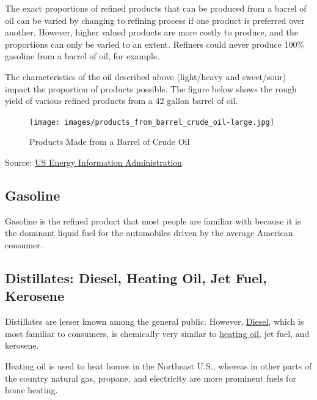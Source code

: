 \documentclass[
  letterpaper,
  DIV=11,
  numbers=noendperiod]{scrreprt}
\begin{document}
The exact proportions of refined products that can be produced from a
barrel of oil can be varied by changing to refining process if one
product is preferred over another. However, higher valued products are
more costly to produce, and the proportions can only be varied to an
extent. Refiners could never produce 100\% gasoline from a barrel of
oil, for example.

The characteristics of the oil described above (light/heavy and
sweet/sour) impact the proportion of products possible. The figure below
shows the rough yield of various refined products from a 42 gallon
barrel of oil.

\begin{figure}[H]

{\centering \texttt{[image: images/products\_from\_barrel\_crude\_oil-large.jpg]}

}

\caption{Products Made from a Barrel of Crude Oil}

\end{figure}%

Source:
\href{http://www.eia.gov/Energyexplained/index.cfm?page=oil_home}{US
Energy Information Administration}

\subsection{Gasoline}\label{gasoline}

Gasoline is the refined product that most people are familiar with
because it is the dominant liquid fuel for the automobiles driven by the
average American consumer.

\subsection{Distillates: Diesel, Heating Oil, Jet Fuel,
Kerosene}\label{distillates-diesel-heating-oil-jet-fuel-kerosene}

Distillates are lesser known among the general public. However,
\href{http://www.eia.gov/Energyexplained/index.cfm?page=diesel_home}{Diesel},
which is most familiar to consumers, is chemically very similar to
\href{http://www.eia.gov/Energyexplained/index.cfm?page=heating_oil_use}{heating
oil}, jet fuel, and kerosene.

Heating oil is used to heat homes in the Northeast U.S., whereas in
other parts of the country natural gas, propane, and electricity are
more prominent fuels for home heating.
\end{document}
